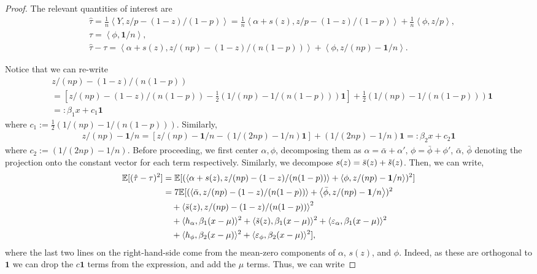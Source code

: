 \documentclass[12pt]{article}
\theoremstyle{definition}
\numberwithin{equation}{section}
\numberwithin{figure}{section}
\newcommand\dotp[1]{\left\langle #1 \right\rangle}
\numberwithin{equation}{section}
\numberwithin{figure}{section}
\begin{document}
\begin{proof}
    The relevant quantities of interest are
    \begin{align}
    &\hat{\tau} = \frac{1}{n}\dotp{ Y, z/p - (1-z)/(1-p)}  = \frac{1}{n}\dotp{\alpha + s(z), z/p - (1-z)/(1-p) } + \frac{1}{n}\dotp{ \phi, z/p },\\
    &\tau = \dotp{ \phi, \mathbf{1}/n }, \\
    &\hat{\tau} - \tau = \dotp{\alpha + s(z), z/(np) - (1-z)/(n(1-p))} + \dotp{ \phi,z/(np) - \mathbf{1}/n }.
    \end{align}
    
    Notice that we can re-write
    \begin{align*}
    &z/(np) - (1-z)/(n(1-p)) \\
    &= \left[z/(np) - (1-z)/(n(1-p)) - \frac{1}{2}(1/(np) - 1/(n(1-p))) \mathbf{1} \right] +  \frac{1}{2}(1/(np) - 1/(n(1-p))) \mathbf{1}\\
    &=: \beta_1 x + c_1 \mathbf{1}
    \end{align*}
    where $c_1 := \frac{1}{2}(1/(np) - 1/(n(1-p)))$. Similarly,
    \begin{align*}
        z/(np) - \mathbf{1}/n = [z/(np) - \mathbf{1}/n - (1/(2np)-1/n) \mathbf{1}] + (1/(2np)-1/n)\mathbf{1} =: \beta_2 x + c_2 \mathbf{1}
    \end{align*}
    where $c_2 := (1/(2np)-1/n)$.
     Before proceeding, we first center $\alpha, \phi$, decomposing them as $\alpha = \bar{\alpha} + \alpha',\, \phi = \bar{\phi} + \phi'$, $\bar{\alpha},\, \bar{\phi}$ denoting the projection onto the constant vector for each term respectively. Similarly, we decompose $s(z) = \Bar{s}(z) + \Tilde{s}(z)$. Then, we can write,
     \begin{align*}
        \mathbb{E}[(\hat{\tau} - \tau )^2]  &=  \mathbb{E}[(\dotp{\alpha + s(z), z/(np) - (1-z)/(n(1-p))} + \dotp{ \phi,z/(np) - \mathbf{1}/n })^2]\\
        &= 7 \mathbb{E}[(\dotp{\bar{\alpha}, z/(np) - (1-z)/(n(1-p))} + \dotp{ \bar{\phi},z/(np) - \mathbf{1}/n })^2 \\
        &\quad + \dotp{\bar{s}(z), z/(np) - (1-z)/(n(1-p))}^2\\
        &\quad + \langle h_\alpha, \beta_1 (x - \mu)\rangle^2 + \langle \Tilde{s}(z), \beta_1 (x - \mu)\rangle^2 + \langle \varepsilon_\alpha, \beta_1 (x - \mu)\rangle^2 \\
        &\quad + \langle h_\phi, \beta_2 (x - \mu) \rangle^2 + \langle \varepsilon_\phi, \beta_2 (x - \mu)\rangle^2],
     \end{align*} where the last two lines on the right-hand-side come from the mean-zero components of $\alpha$, $s(z)$, and $\phi$. Indeed, as these are orthogonal to $\mathbf{1}$ we can drop the $c \mathbf{1}$ terms from the expression, and add the $\mu$ terms. Thus, we can write

\end{proof}
\end{document}
